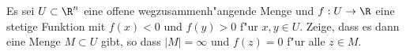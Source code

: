 \begin{prob}
Es sei $U\subset\R^n$ eine offene wegzusammenh"angende Menge und $f:U\to\R$ eine stetige Funktion mit $f(x)<0$ und $f(y)>0$ f"ur $x,y\in U$. Zeige, dass es dann eine Menge $M\subset U$ gibt, so dass $|M|=\infty$ und $f(z)=0$ f"ur alle $z\in M$.
\end{prob}
